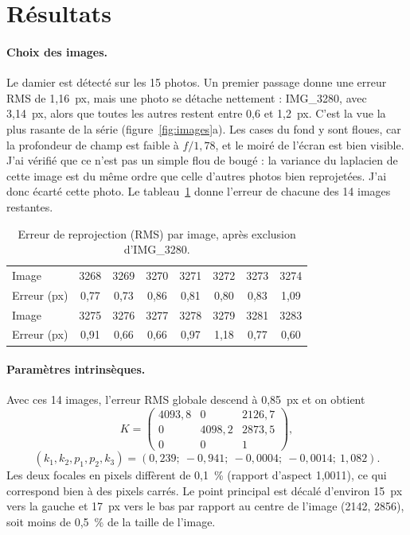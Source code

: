 \documentclass[11pt,a4paper]{article}
\begin{document}
\section{Résultats}

\paragraph{Choix des images.} Le damier est détecté sur les 15 photos. Un premier passage donne une erreur RMS de 1,16~px, mais une photo se détache nettement : IMG\_3280, avec 3,14~px, alors que toutes les autres restent entre 0,6 et 1,2~px. C'est la vue la plus rasante de la série (figure~\ref{fig:images}a). Les cases du fond y sont floues, car la profondeur de champ est faible à $f/1{,}78$, et le moiré de l'écran est bien visible. J'ai vérifié que ce n'est pas un simple flou de bougé : la variance du laplacien de cette image est du même ordre que celle d'autres photos bien reprojetées. J'ai donc écarté cette photo. Le tableau~\ref{tab:erreurs} donne l'erreur de chacune des 14 images restantes.

\begin{table}[h]
\centering
\small
\begin{tabular}{l*{7}{c}}
\toprule
Image & 3268 & 3269 & 3270 & 3271 & 3272 & 3273 & 3274\\
Erreur (px) & 0,77 & 0,73 & 0,86 & 0,81 & 0,80 & 0,83 & 1,09\\
\midrule
Image & 3275 & 3276 & 3277 & 3278 & 3279 & 3281 & 3283\\
Erreur (px) & 0,91 & 0,66 & 0,66 & 0,97 & 1,18 & 0,77 & 0,60\\
\bottomrule
\end{tabular}
\caption{Erreur de reprojection (RMS) par image, après exclusion d'IMG\_3280.}
\label{tab:erreurs}
\end{table}

\paragraph{Paramètres intrinsèques.} Avec ces 14 images, l'erreur RMS globale descend à 0,85~px et on obtient
\[
K=\begin{pmatrix}4093{,}8 & 0 & 2126{,}7\\ 0 & 4098{,}2 & 2873{,}5\\ 0&0&1\end{pmatrix},
\]
\[
(k_1,k_2,p_1,p_2,k_3)=(0{,}239;\ -0{,}941;\ -0{,}0004;\ -0{,}0014;\ 1{,}082).
\]
Les deux focales en pixels diffèrent de 0,1~\% (rapport d'aspect 1,0011), ce qui correspond bien à des pixels carrés. Le point principal est décalé d'environ 15~px vers la gauche et 17~px vers le bas par rapport au centre de l'image (2142, 2856), soit moins de 0,5~\% de la taille de l'image.
\end{document}
